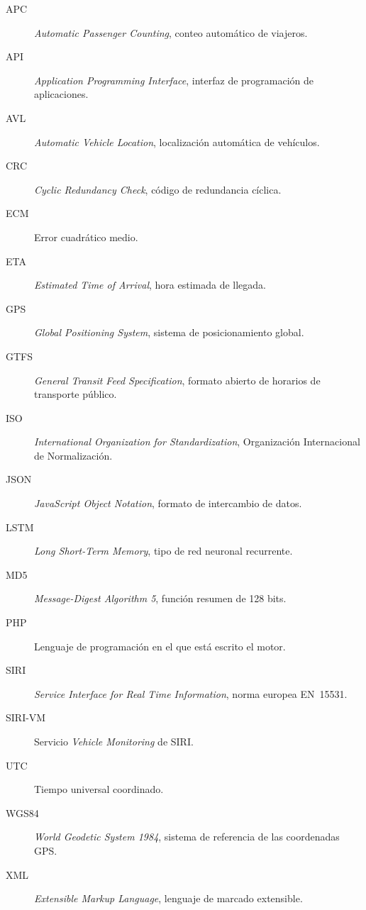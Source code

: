 
\begin{description}
  \item[APC] \emph{Automatic Passenger Counting}, conteo automático de viajeros.
  \item[API] \emph{Application Programming Interface}, interfaz de programación de aplicaciones.
  \item[AVL] \emph{Automatic Vehicle Location}, localización automática de vehículos.
  \item[CRC] \emph{Cyclic Redundancy Check}, código de redundancia cíclica.
  \item[ECM] Error cuadrático medio.
  \item[ETA] \emph{Estimated Time of Arrival}, hora estimada de llegada.
  \item[GPS] \emph{Global Positioning System}, sistema de posicionamiento global.
  \item[GTFS] \emph{General Transit Feed Specification}, formato abierto de horarios de transporte público.
  \item[ISO] \emph{International Organization for Standardization}, Organización Internacional de Normalización.
  \item[JSON] \emph{JavaScript Object Notation}, formato de intercambio de datos.
  \item[LSTM] \emph{Long Short-Term Memory}, tipo de red neuronal recurrente.
  \item[MD5] \emph{Message-Digest Algorithm 5}, función resumen de 128 bits.
  \item[PHP] Lenguaje de programación en el que está escrito el motor.
  \item[SIRI] \emph{Service Interface for Real Time Information}, norma europea EN~15531.
  \item[SIRI-VM] Servicio \emph{Vehicle Monitoring} de SIRI.
  \item[UTC] Tiempo universal coordinado.
  \item[WGS84] \emph{World Geodetic System 1984}, sistema de referencia de las coordenadas GPS.
  \item[XML] \emph{Extensible Markup Language}, lenguaje de marcado extensible.
\end{description}
